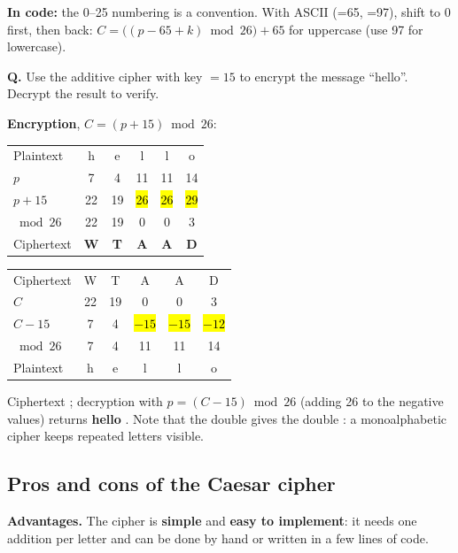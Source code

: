 \textbf{In code:} the 0--25 numbering is a convention. With ASCII (=65, =97), shift to 0 first, then back:
\;$C = \big((p - 65 + k) \bmod 26\big) + 65$ for uppercase (use 97 for lowercase).

\begin{worked}
\textbf{Q.} Use the additive cipher with key $= 15$ to encrypt the message ``hello''. Decrypt the result to verify.

\textbf{Encryption}, $C = (p + 15) \bmod 26$:
\begin{center}\small\setlength{\tabcolsep}{6pt}
\begin{tabular}{@{}l*{5}{c}@{}}
\toprule
Plaintext & h&e&l&l&o\\
$p$ & 7&4&11&11&14\\
$p + 15$ & 22&19&\hl{26}&\hl{26}&\hl{29}\\
$\bmod 26$ & 22&19&0&0&3\\
Ciphertext & \textbf{W}&\textbf{T}&\textbf{A}&\textbf{A}&\textbf{D}\\
\bottomrule
\end{tabular}
\qquad
\begin{tabular}{@{}l*{5}{c}@{}}
\toprule
Ciphertext & W&T&A&A&D\\
$C$ & 22&19&0&0&3\\
$C - 15$ & 7&4&\hl{$-15$}&\hl{$-15$}&\hl{$-12$}\\
$\bmod 26$ & 7&4&11&11&14\\
Plaintext & h&e&l&l&o\\
\bottomrule
\end{tabular}
\end{center}
Ciphertext \textbf{}; decryption with $p = (C - 15) \bmod 26$ (adding 26 to the negative values) returns \textbf{hello} \checkmark. Note that the double  gives the double : a monoalphabetic cipher keeps repeated letters visible.
\end{worked}

\subsection{Pros and cons of the Caesar cipher}
\textbf{Advantages.} The cipher is \textbf{simple} and \textbf{easy to implement}: it needs one addition per letter and can be done by hand or written in a few lines of code.

